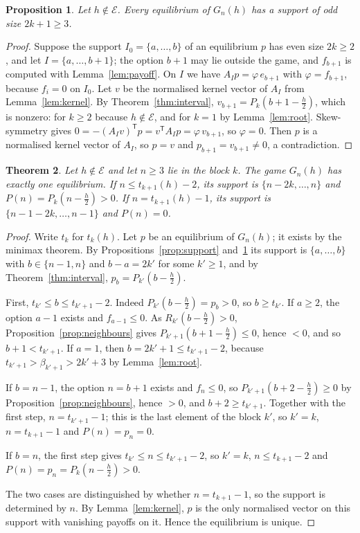\documentclass[11pt]{article}
\newtheorem{theorem}{Theorem}[section]
\newtheorem{proposition}[theorem]{Proposition}
\theoremstyle{definition}
\theoremstyle{remark}
\begin{document}
\begin{proposition}\label{prop:odd}
Let $h\notin\mathcal E$. Every equilibrium of $G_n(h)$ has a support of
odd size $2k+1\ge3$.
\end{proposition}

\begin{proof}
Suppose the support $I_0=\{a,\dots,b\}$ of an equilibrium $p$ has even
size $2k\ge2$, and let $I=\{a,\dots,b+1\}$; the option $b+1$ may lie
outside the game, and $f_{b+1}$ is computed with
Lemma~\ref{lem:payoff}. On $I$ we have $A_Ip=\varphi\,e_{b+1}$ with
$\varphi=f_{b+1}$, because $f_i=0$ on $I_0$. Let $v$ be the normalised
kernel vector of $A_I$ from Lemma~\ref{lem:kernel}. By
Theorem~\ref{thm:interval}, $v_{b+1}=P_k(b+1-\frac h2)$, which is
nonzero: for $k\ge2$ because $h\notin\mathcal E$, and for $k=1$ by
Lemma~\ref{lem:root}. Skew-symmetry gives
$0=-(A_Iv)^{\mathsf T}p=v^{\mathsf T}A_Ip=\varphi\,v_{b+1}$, so
$\varphi=0$. Then $p$ is a normalised kernel vector of $A_I$, so $p=v$
and $p_{b+1}=v_{b+1}\ne0$, a contradiction.
\end{proof}

\begin{theorem}\label{thm:structure}
Let $h\notin\mathcal E$ and let $n\ge3$ lie in the block $k$. The game
$G_n(h)$ has exactly one equilibrium. If $n\le t_{k+1}(h)-2$, its support
is $\{n-2k,\dots,n\}$ and $P(n)=P_k(n-\frac h2)>0$. If
$n=t_{k+1}(h)-1$, its support is $\{n-1-2k,\dots,n-1\}$ and $P(n)=0$.
\end{theorem}

\begin{proof}
Write $t_k$ for $t_k(h)$. Let $p$ be an equilibrium of $G_n(h)$; it
exists by the minimax theorem. By Propositions~\ref{prop:support}
and~\ref{prop:odd} its support is $\{a,\dots,b\}$ with $b\in\{n-1,n\}$
and $b-a=2k'$ for some $k'\ge1$, and by Theorem~\ref{thm:interval},
$p_b=P_{k'}(b-\frac h2)$.

First, $t_{k'}\le b\le t_{k'+1}-2$. Indeed $P_{k'}(b-\frac h2)=p_b>0$, so
$b\ge t_{k'}$. If $a\ge2$, the option $a-1$ exists and $f_{a-1}\le0$. As
$R_{k'}(b-\frac h2)>0$, Proposition~\ref{prop:neighbours} gives
$P_{k'+1}(b+1-\frac h2)\le0$, hence $<0$, and so $b+1<t_{k'+1}$. If
$a=1$, then $b=2k'+1\le t_{k'+1}-2$, because
$t_{k'+1}>\beta_{k'+1}>2k'+3$ by Lemma~\ref{lem:root}.

If $b=n-1$, the option $n=b+1$ exists and $f_n\le0$, so
$P_{k'+1}(b+2-\frac h2)\ge0$ by Proposition~\ref{prop:neighbours}, hence
$>0$, and $b+2\ge t_{k'+1}$. Together with the first step,
$n=t_{k'+1}-1$; this is the last element of the block $k'$, so $k'=k$,
$n=t_{k+1}-1$ and $P(n)=p_n=0$.

If $b=n$, the first step gives $t_{k'}\le n\le t_{k'+1}-2$, so $k'=k$,
$n\le t_{k+1}-2$ and $P(n)=p_n=P_k(n-\frac h2)>0$.

The two cases are distinguished by whether $n=t_{k+1}-1$, so the support
is determined by $n$. By Lemma~\ref{lem:kernel}, $p$ is the only
normalised vector on this support with vanishing payoffs on it. Hence the
equilibrium is unique.
\end{proof}
\end{document}
